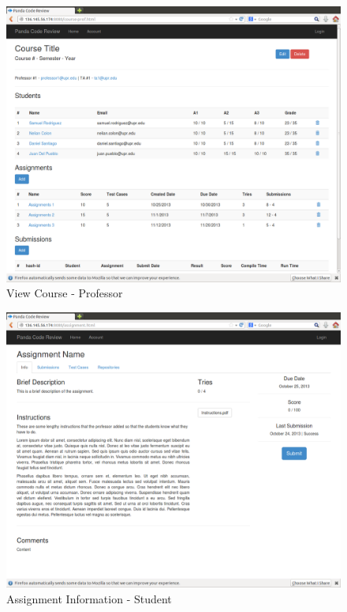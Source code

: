 \begin{figure}[H]
	\centering
	\includegraphics[width=\textwidth]{img/course-prof}
	\caption{View Course - Professor}
\end{figure}

\begin{figure}[H]
	\centering
	\includegraphics[width=\textwidth]{img/assignment-info}
	\caption{Assignment Information - Student}
\end{figure}

